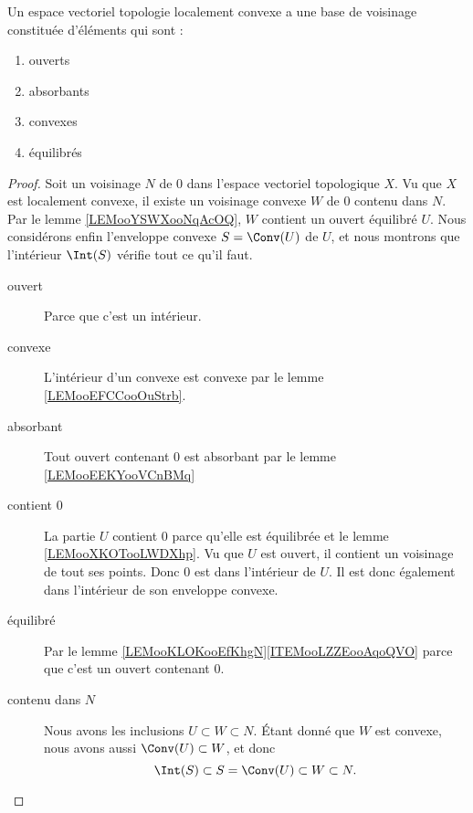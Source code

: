 \begin{proposition}		\label{PROPooOAXHooOGhRbu}
	Un espace vectoriel topologie localement convexe a une base de voisinage constituée d'éléments qui sont :
	\begin{enumerate}
		\item
		      ouverts
		\item
		      absorbants
		\item
		      convexes
		\item
		      équilibrés
	\end{enumerate}
\end{proposition}

\begin{proof}
	Soit un voisinage \( N\) de \( 0\) dans l'espace vectoriel topologique \( X\). Vu que \( X\) est localement convexe, il existe un voisinage convexe \( W\) de \( 0\) contenu dans \( N\). Par le lemme \ref{LEMooYSWXooNqAcOQ}, \( W\) contient un ouvert équilibré \( U\). Nous considérons enfin l'enveloppe convexe \( S=\Conv(U)\) de \( U\), et nous montrons que l'intérieur \( \Int(S)\) vérifie tout ce qu'il faut.

	\begin{description}
		\item[ouvert] Parce que c'est un intérieur.
		\item[convexe] L'intérieur d'un convexe est convexe par le lemme \ref{LEMooEFCCooOuStrb}.
		\item[absorbant] Tout ouvert contenant \( 0\) est absorbant par le lemme \ref{LEMooEEKYooVCnBMq}
		\item[contient \( 0\)] La partie \( U\) contient \( 0\) parce qu'elle est équilibrée et le lemme \ref{LEMooXKOTooLWDXhp}. Vu que \( U\) est ouvert, il contient un voisinage de tout ses points. Donc \( 0\) est dans l'intérieur de \( U\). Il est donc également dans l'intérieur de son enveloppe convexe.
		\item[équilibré] Par le lemme \ref{LEMooKLOKooEfKhgN}\ref{ITEMooLZZEooAqoQVO} parce que c'est un ouvert contenant \( 0\).
		\item[contenu dans \( N\)] Nous avons les inclusions \( U\subset W\subset N\). Étant donné que \( W\) est convexe, nous avons aussi \( \Conv(U)\subset W\), et donc
			\begin{equation}
				\Int(S)\subset S=\Conv(U)\subset W\subset N.
			\end{equation}
	\end{description}
\end{proof}

